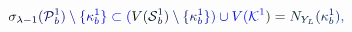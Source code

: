 \documentclass[12pt]{article}
\begin{document}
\makeatletter
\renewcommand*{\@textcolor}[3]{%
  \protect\leavevmode
  \begingroup
    \color#1{#2}#3%
  \endgroup
}
\makeatother
\begin{displaymath}
\mathcolor[RGB]{0,0,15}{\sigma} _ { \mathcolor[RGB]{0,0,30}{\lambda} \mathcolor[RGB]{0,0,45}{-} \mathcolor[RGB]{0,0,60}{1} } \mathcolor[RGB]{0,0,75}{(} \mathcal { \mathcolor[RGB]{0,0,90}{P} } _ { \mathcolor[RGB]{0,0,105}{b} } ^ { \mathcolor[RGB]{0,0,120}{1} } \mathcolor[RGB]{0,0,135}{)} \mathcolor[RGB]{0,0,150}{\setminus} \mathcolor[RGB]{0,0,165}{\{} \mathcolor[RGB]{0,0,180}{\kappa} _ { \mathcolor[RGB]{0,0,195}{b} } ^ { \mathcolor[RGB]{0,0,210}{1} } \mathcolor[RGB]{0,0,225}{\}} \mathcolor[RGB]{0,0,240}{\subset} \mathcolor[RGB]{0,0,255}{(} \mathcolor[RGB]{0,15,0}{V} \mathcolor[RGB]{0,15,15}{(} \mathcal { \mathcolor[RGB]{0,15,30}{S} } _ { \mathcolor[RGB]{0,15,45}{b} } ^ { \mathcolor[RGB]{0,15,60}{1} } \mathcolor[RGB]{0,15,75}{)} \mathcolor[RGB]{0,15,90}{\setminus} \mathcolor[RGB]{0,15,105}{\{} \mathcolor[RGB]{0,15,120}{\kappa} _ { \mathcolor[RGB]{0,15,135}{b} } ^ { \mathcolor[RGB]{0,15,150}{1} } \mathcolor[RGB]{0,15,165}{\}} \mathcolor[RGB]{0,15,180}{)} \mathcolor[RGB]{0,15,195}{\cup} \mathcolor[RGB]{0,15,210}{V} \mathcolor[RGB]{0,15,225}{(} \mathcal { \mathcolor[RGB]{0,15,240}{K} } ^ { \mathcolor[RGB]{0,15,255}{1} } \mathcolor[RGB]{0,30,0}{)} \mathcolor[RGB]{0,30,15}{=} \mathcolor[RGB]{0,30,30}{N} _ { \mathcolor[RGB]{0,30,45}{Y} _ { \mathcolor[RGB]{0,30,60}{L} } } \mathcolor[RGB]{0,30,75}{(} \mathcolor[RGB]{0,30,90}{\kappa} _ { \mathcolor[RGB]{0,30,105}{b} } ^ { \mathcolor[RGB]{0,30,120}{1} } \mathcolor[RGB]{0,30,135}{)} \mathcolor[RGB]{0,30,150}{,}
\end{displaymath}
\end{document}
